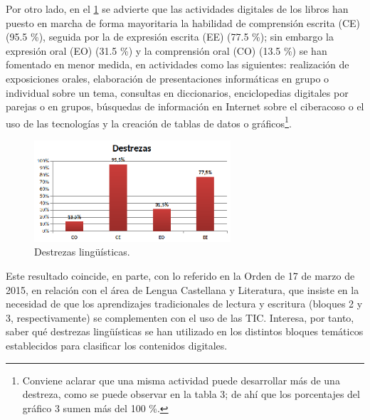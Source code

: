 \documentclass{textolivre}
\begin{document}
Por otro lado, en el \cref{Fig03} se advierte que las actividades digitales de los libros han puesto en marcha de forma mayoritaria la habilidad de comprensión escrita (CE) (95.5 \%), seguida por la de expresión escrita (EE) (77.5 \%); sin embargo la expresión oral (EO) (31.5 \%) y la comprensión oral (CO) (13.5 \%) se han fomentado en menor medida, en actividades como las siguientes: realización de exposiciones orales, elaboración de presentaciones informáticas en grupo o individual sobre un tema, consultas en diccionarios, enciclopedias digitales por parejas o en grupos, búsquedas de información en Internet sobre el ciberacoso o el uso de las tecnologías y la creación de tablas de datos o gráficos\footnote{Conviene aclarar que una misma actividad puede desarrollar más de una destreza, como se puede observar en la tabla 3; de ahí que los porcentajes del gráfico 3 sumen más del 100 \%.}. 

\begin{figure}[htbp]
 \centering
 \includegraphics[width=0.65\textwidth]{Fig03.eps}
 \caption{Destrezas lingüísticas.}
 \label{Fig03}
\end{figure}

Este resultado coincide, en parte, con lo referido en la Orden de 17 de marzo de 2015, en relación con el área de Lengua Castellana y Literatura, que insiste en la necesidad de que los aprendizajes tradicionales de lectura y escritura (bloques 2 y 3, respectivamente) se complementen con el uso de las TIC. Interesa, por tanto, saber qué destrezas lingüísticas se han utilizado en los distintos bloques temáticos establecidos para clasificar los contenidos digitales. 
\end{document}
